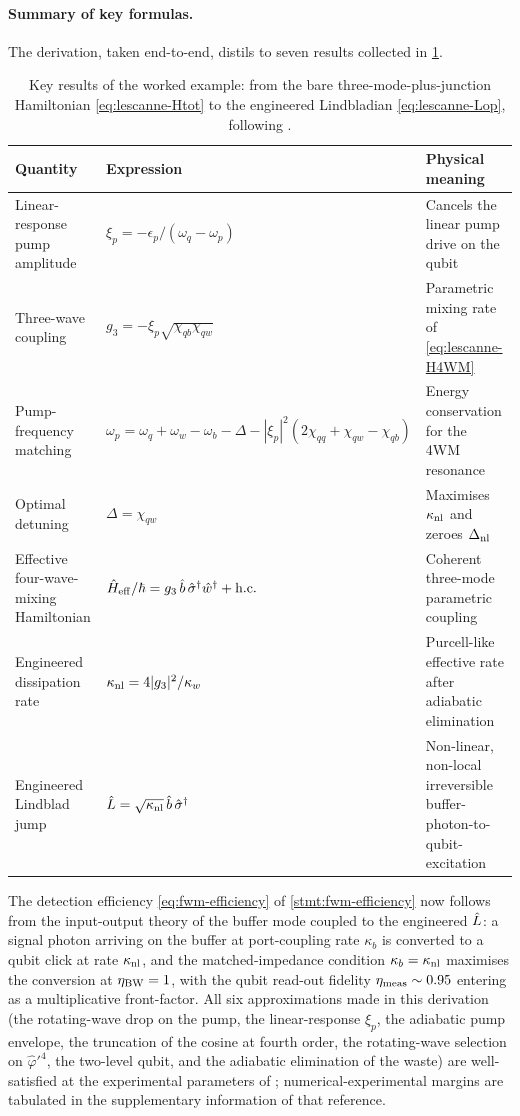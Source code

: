 \paragraph{Summary of key formulas.}
The derivation, taken end-to-end, distils to seven results
collected in \cref{tab:lescanne-summary}.
\begin{table}[h]
\centering
\renewcommand{\arraystretch}{1.25}
\begin{tabular}{p{} l p{}}
\toprule
Quantity & Expression & Physical meaning \\
\midrule
Linear-response pump amplitude & $\xi_p=-\epsilon_p/(\omega_q-\omega_p)$ & Cancels the linear pump drive on the qubit \\
Three-wave coupling & $g_3=-\xi_p\sqrt{\chi_{qb}\chi_{qw}}$ & Parametric mixing rate of \cref{eq:lescanne-H4WM} \\
Pump-frequency matching & $\omega_p=\omega_q+\omega_w-\omega_b-\Delta-|\xi_p|^2(2\chi_{qq}+\chi_{qw}-\chi_{qb})$ & Energy conservation for the 4WM resonance \\
Optimal detuning & $\Delta=\chi_{qw}$ & Maximises $\kappa_{\rm nl}$ and zeroes $\Delta_{\rm nl}$ \\
Effective four-wave-mixing Hamiltonian & $\hat{H}_{\rm eff}/\hbar=g_3\,\hat b\,\hat\sigma^\dagger\hat w^\dagger+\hbox{h.c.}$ & Coherent three-mode parametric coupling \\
Engineered dissipation rate & $\kappa_{\rm nl}=4|g_3|^2/\kappa_w$ & Purcell-like effective rate after adiabatic elimination \\
Engineered Lindblad jump & $\hat{L}=\sqrt{\kappa_{\rm nl}}\,\hat b\,\hat\sigma^\dagger$ & Non-linear, non-local irreversible buffer-photon-to-qubit-excitation \\
\bottomrule
\end{tabular}
\caption[]{Key results of the worked example: from the bare three-mode-plus-junction Hamiltonian \cref{eq:lescanne-Htot} to the engineered Lindbladian \cref{eq:lescanne-Lop}, following \cite{lescanne2020}.}
\label{tab:lescanne-summary}
\end{table}
The detection efficiency \cref{eq:fwm-efficiency} of
\cref{stmt:fwm-efficiency} now follows from the input-output theory
of the buffer mode coupled to the engineered $\hat{L}$: a
signal photon arriving on the buffer at port-coupling rate
$\kappa_b$ is converted to a qubit click at rate $\kappa_{\rm nl}$,
and the matched-impedance condition $\kappa_b=\kappa_{\rm nl}$
maximises the conversion at $\eta_{\rm BW}=1$, with the qubit
read-out fidelity $\eta_{\rm meas}\sim 0.95$ entering as a
multiplicative front-factor. All six approximations made in this
derivation (the rotating-wave drop on the pump, the linear-response
$\xi_p$, the adiabatic pump envelope, the truncation of the cosine
at fourth order, the rotating-wave selection on $\hat\varphi'^4$,
the two-level qubit, and the adiabatic elimination of the waste)
are well-satisfied at the experimental parameters of
\cite{lescanne2020}; numerical-experimental margins are tabulated
in the supplementary information of that reference.

